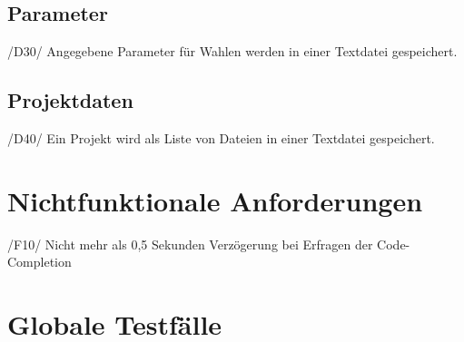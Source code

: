 \documentclass[a4paper]{scrreprt}
\begin{document}
\section{Parameter}
/D30/ Angegebene Parameter für Wahlen werden in einer Textdatei gespeichert.

\section{Projektdaten}
/D40/ Ein Projekt wird als Liste von Dateien in einer Textdatei gespeichert.


\chapter{Nichtfunktionale Anforderungen}
/F10/ Nicht mehr als 0,5 Sekunden Verzögerung bei Erfragen der Code-Completion


\chapter{Globale Testfälle}
\end{document}
